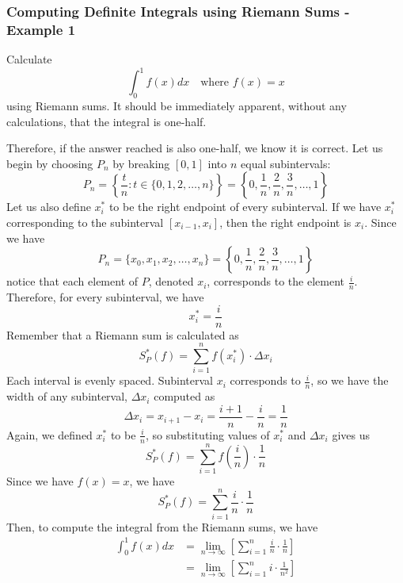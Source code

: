 \documentclass[10pt]{article}
\begin{document}
\subsubsection{Computing Definite Integrals using Riemann Sums - Example 1}
Calculate
$$
    \int_0^1 f(x) dx\quad\text{where $f(x)=x$}
$$
using Riemann sums.
It should be immediately apparent, without any calculations, that the integral is one-half.
\begin{center}
\end{center}
Therefore, if the answer reached is also one-half, we know it is correct. Let us begin by choosing $P_n$ by breaking $[0,1]$ into $n$ equal subintervals:
$$
    P_n=\left\{\frac{t}{n}:t\in\{0,1,2,\dots,n\}\right\}=\left\{0,\frac{1}{n},\frac{2}{n},\frac{3}{n},\dots,1\right\}
$$
Let us also define $x_i^*$ to be the right endpoint of every subinterval. If we have $x_i^*$ corresponding to the subinterval $[x_{i-1},x_i]$, then the right endpoint is $x_i$. Since we have
$$
    P_n=\{x_0,x_1,x_2,\dots,x_n\}=\left\{0,\frac{1}{n},\frac{2}{n},\frac{3}{n},\dots,1\right\}
$$
notice that each element of $P$, denoted $x_i$, corresponds to the element $\frac{i}{n}$. Therefore, for every subinterval, we have
$$
    x_i^*=\frac{i}{n}
$$
Remember that a Riemann sum is calculated as
$$
    S_P^*(f)=\sum_{i=1}^nf(x_i^*)\cdot\Delta x_i
$$
Each interval is evenly spaced. Subinterval $x_i$ corresponds to $\frac{i}{n}$, so we have the width of any subinterval, $\Delta x_i$ computed as
$$
    \Delta x_i=x_{i+1}-x_i=\frac{i+1}{n}-\frac{i}{n}=\frac{1}{n}
$$
Again, we defined $x_i^*$ to be $\frac{i}{n}$, so substituting values of $x_i^*$ and $\Delta x_i$ gives us
$$
    S_P^*(f)=\sum_{i=1}^nf\left(\frac{i}{n}\right)\cdot\frac{1}{n}
$$
Since we have $f(x)=x$, we have
$$
    S_P^*(f)=\sum_{i=1}^n\frac{i}{n}\cdot\frac{1}{n}
$$
Then, to compute the integral from the Riemann sums, we have
$$
    \begin{aligned}
        \int_0^1 f(x) dx & =\lim_{n\to\infty}\left[\sum_{i=1}^n\frac{i}{n}\cdot\frac{1}{n}\right] \\
                         & =\lim_{n\to\infty}\left[\sum_{i=1}^n i\cdot \frac{1}{n^2}\right]
    \end{aligned}
$$
\end{document}
